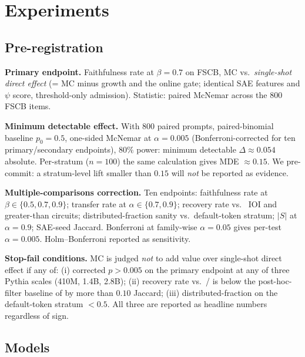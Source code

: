 \documentclass[10pt]{article}
\begin{document}
\section{Experiments}
\label{sec:experiments}

\subsection{Pre-registration}
\label{sec:prereg}

\textbf{Primary endpoint.} Faithfulness rate at $\beta = 0.7$ on FSCB, MC vs.\ \emph{single-shot direct effect} (= MC minus growth and the online gate; identical SAE features and $\psi$ score, threshold-only admission). Statistic: paired McNemar across the 800 FSCB items.

\textbf{Minimum detectable effect.} With 800 paired prompts, paired-binomial baseline $p_0 = 0.5$, one-sided McNemar at $\alpha = 0.005$ (Bonferroni-corrected for ten primary/secondary endpoints), $80\%$ power: minimum detectable $\Delta \approx 0.054$ absolute. Per-stratum ($n = 100$) the same calculation gives MDE $\approx 0.15$. We pre-commit: a stratum-level lift smaller than $0.15$ will \emph{not} be reported as evidence.

\textbf{Multiple-comparisons correction.} Ten endpoints: faithfulness rate at $\beta \in \{0.5, 0.7, 0.9\}$; transfer rate at $\alpha \in \{0.7, 0.9\}$; recovery rate vs.\ \citet{wang2022interpretability} IOI and \citet{hanna2023greater} greater-than circuits; distributed-fraction sanity vs.\ default-token stratum; $|S|$ at $\alpha = 0.9$; SAE-seed Jaccard. Bonferroni at family-wise $\alpha = 0.05$ gives per-test $\alpha = 0.005$. Holm--Bonferroni reported as sensitivity.

\textbf{Stop-fail conditions.} MC is judged \emph{not} to add value over single-shot direct effect if any of: (i) corrected $p > 0.005$ on the primary endpoint at any of three Pythia scales (410M, 1.4B, 2.8B); (ii) recovery rate vs.\ \citet{wang2022interpretability}/\citet{hanna2023greater} is below the post-hoc-filter baseline of \citet{marks2024sparse} by more than $0.10$ Jaccard; (iii) distributed-fraction on the default-token stratum $< 0.5$. All three are reported as headline numbers regardless of sign.

\subsection{Models}
\end{document}
